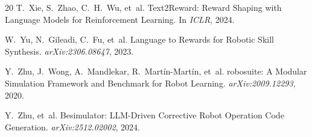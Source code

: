 \documentclass[11pt]{article}
\begin{document}
\begin{thebibliography}{20}
T.~Xie, S.~Zhao, C.~H.~Wu, et~al.
\newblock Text2Reward: Reward Shaping with Language Models for Reinforcement Learning.
\newblock In \emph{ICLR}, 2024.

W.~Yu, N.~Gileadi, C.~Fu, et~al.
\newblock Language to Rewards for Robotic Skill Synthesis.
\newblock \emph{arXiv:2306.08647}, 2023.

Y.~Zhu, J.~Wong, A.~Mandlekar, R.~Mart\'{i}n-Mart\'{i}n, et~al.
\newblock robosuite: A Modular Simulation Framework and Benchmark for Robot Learning.
\newblock \emph{arXiv:2009.12293}, 2020.

Y.~Zhu, et~al.
\newblock Besimulator: LLM-Driven Corrective Robot Operation Code Generation.
\newblock \emph{arXiv:2512.02002}, 2024.

\end{thebibliography}
\end{document}
